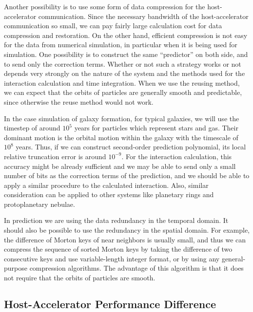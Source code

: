 Another possibility is to use some form of data compression for
the host-accelerator communication. Since the necessary bandwidth of
the host-accelerator communication so small, we can pay fairly large
calculation cost for data compression and restoration. On the other
hand, efficient compression is not easy for the data from numerical
simulation, in particular when it is being used for simulation. One
possibility is to construct the same ``predictor'' on both side, and
to send only the correction terms. Whether or not such a strategy
works or not depends very strongly on the nature of the system and
the methods used for the interaction calculation and time integration.
When we use the reusing method, we can expect that the orbits of
particles are generally smooth and predictable, since otherwise the
reuse method would not work. 

In the case simulation of galaxy formation, for typical galaxies, we
will use the timestep of around $10^5$ years for particles which
represent stars and gas. Their dominant motion is the orbital motion
within the galaxy with the timescale of $10^8$ years. Thus, if we can
construct second-order prediction polynomial, its local relative
truncation error is around $10^{-9}$. For the interaction calculation,
this accuracy might be already sufficient and we may be able to send
only a small number of bits as the correction terms of the prediction,
and we should be able to apply a similar procedure to the calculated
interaction. Also, similar consideration can be applied to other
systems like planetary rings and  protoplanetary nebulae.

In prediction we are using the data redundancy in the temporal
domain. It should also be possible to use the redundancy in the spatial
domain. For example, the difference of Morton keys of near neighbors
is usually small, and thus we can compress the sequence of sorted
Morton keys by taking the difference of two consecutive keys and use
variable-length integer format, or by using any general-purpose
compression algorithms. The advantage of this algorithm is that it
does not require that the orbits of particles are smooth.

\subsection{Host-Accelerator Performance Difference}

